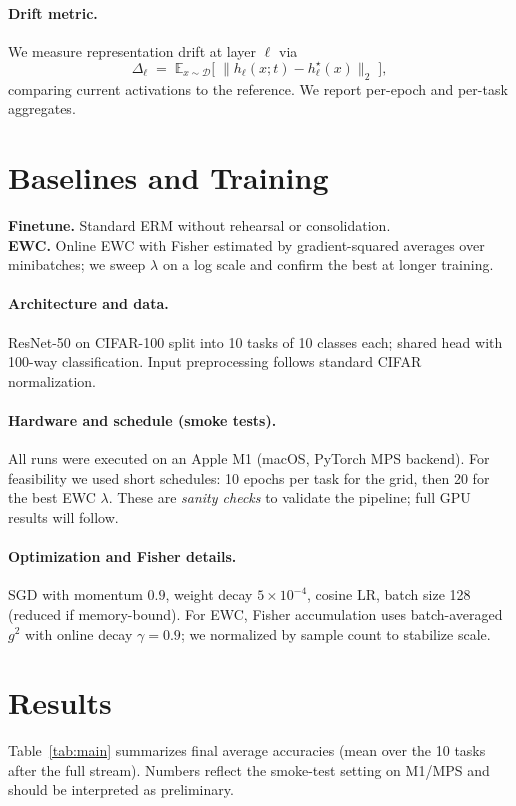 \documentclass[11pt]{article}
\newcommand{\EWC}{\textsc{EWC}}
\begin{document}
\paragraph{Drift metric.}
We measure representation drift at layer $\ell$ via 
\begin{equation}
  \Delta_\ell \;=\; \mathbb{E}_{x \sim \mathcal{D}}\Big[\;\|h_\ell(x;t) - h_\ell^\star(x)\|_2\;\Big],
\end{equation}
comparing current activations to the reference. We report per-epoch and per-task aggregates.

\section{Baselines and Training}
\textbf{Finetune.} Standard ERM without rehearsal or consolidation.\\
\textbf{\EWC{}.} Online \EWC{} with Fisher estimated by gradient-squared averages over minibatches; we sweep $\lambda$ on a log scale and confirm the best at longer training.

\paragraph{Architecture and data.}
ResNet-50 on CIFAR-100 split into 10 tasks of 10 classes each; shared head with 100-way classification. Input preprocessing follows standard CIFAR normalization.

\paragraph{Hardware and schedule (smoke tests).}
All runs were executed on an Apple M1 (macOS, PyTorch MPS backend). For feasibility we used short schedules: 10 epochs per task for the grid, then 20 for the best \EWC{} $\lambda$. These are \emph{sanity checks} to validate the pipeline; full GPU results will follow.

\paragraph{Optimization and Fisher details.}
SGD with momentum $0.9$, weight decay $5\!\times\!10^{-4}$, cosine LR, batch size 128 (reduced if memory-bound). For \EWC{}, Fisher accumulation uses batch-averaged $g^2$ with online decay $\gamma=0.9$; we normalized by sample count to stabilize scale.

\section{Results}
Table~\ref{tab:main} summarizes final average accuracies (mean over the 10 tasks after the full stream). Numbers reflect the smoke-test setting on M1/MPS and should be interpreted as preliminary.
\end{document}
